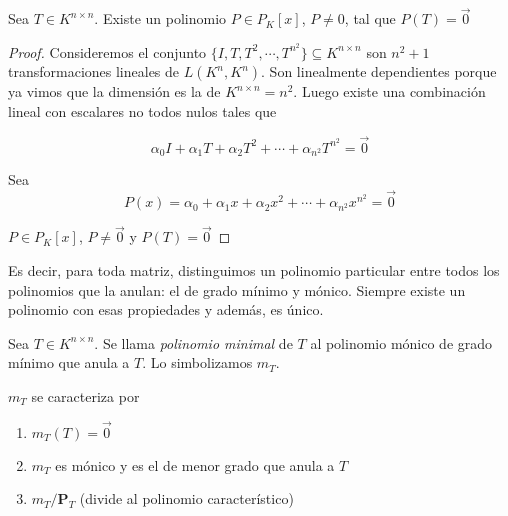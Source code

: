\bigskip 

\begin{theorem}

\label{LEMA}

Sea $T  \in K^{n \times n}$. Existe un polinomio $P \in P_K\left[x\right]$, $P\neq 0$, tal que $P(T)=\vec{0}
$


\begin{proof}



Consideremos el conjunto  $\{I,T, T^2,\cdots,T^{n^2}\} \subseteq K^{n \times n}$ son $n^2+1$ transformaciones lineales de $L(K^n,K^n)$. Son linealmente dependientes porque ya vimos que  la dimensión  es la de $K^{n \times n}= n^2$. Luego existe una combinación lineal con escalares no todos nulos tales que 

$$\alpha_0I+\alpha_1T+\alpha_2T^2+\cdots+\alpha_{n^2}T^{n^2}=\vec{0}$$


Sea 
$$P(x)=\alpha_0+\alpha_1x+\alpha_2x^2+\cdots+\alpha_{n^2}x^{n^2}=\vec{0}$$
	
	
$P \in P_K\left[x\right]$, $P\neq\vec{0}$ y $P(T)=\vec{0}$ 

\bigskip 


\end{proof}
\end{theorem}

\bigskip 


Es decir, para toda matriz, distinguimos un polinomio particular entre todos los polinomios que la anulan: el de grado mínimo y mónico. Siempre existe un polinomio con esas propiedades y además, es único.

\bigskip 


\begin{definition} 

Sea $T  \in K^{n \times n}$.  Se llama \textit{polinomio minimal} de $T$ al polinomio mónico de grado mínimo que anula a $T$. Lo simbolizamos $m_T$.
\end{definition} 

\bigskip 

\begin{remark}
$m_T$ se caracteriza por 

\begin{enumerate}

\item $m_T(T)=\vec{0}$

\item $m_T$ es mónico y es el de menor grado que anula a $T$

\item $m_T / \mathbf{P}_T$  (divide al polinomio característico)

\end{enumerate}
\end{remark}


